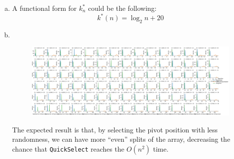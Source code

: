 \documentclass[11pt]{scrartcl}
\theoremstyle{dotlessP}
\theoremstyle{dotlessN}
\begin{document}
\begin{enumerate}[(a)]
\item A functional form for $k_n^*$ could be the following:
	\[
	k^*(n) = \log_2 n + 20
	\] 
\item \
	\begin{figure}[H]
		\centering
		\includegraphics[width=\textwidth]{Figure_2.png}
	\end{figure}
	The expected result is that, by selecting the pivot position with less randomness, we can have more ``even'' splits of the array, decreasing the chance that \texttt{QuickSelect} reaches the $O(n^2)$ time.  
\end{enumerate}
\end{document}
